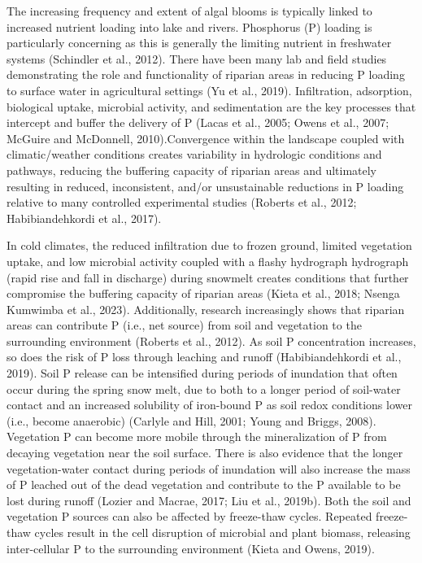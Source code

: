 \documentclass[
]{agujournal2019}
\begin{document}
The increasing frequency and extent of algal blooms is typically linked
to increased nutrient loading into lake and rivers. Phosphorus (P)
loading is particularly concerning as this is generally the limiting
nutrient in freshwater systems (Schindler et al., 2012). There have been
many lab and field studies demonstrating the role and functionality of
riparian areas in reducing P loading to surface water in agricultural
settings (Yu et al., 2019). Infiltration, adsorption, biological uptake,
microbial activity, and sedimentation are the key processes that
intercept and buffer the delivery of P (Lacas et al., 2005; Owens et
al., 2007; McGuire and McDonnell, 2010).Convergence within the landscape
coupled with climatic/weather conditions creates variability in
hydrologic conditions and pathways, reducing the buffering capacity of
riparian areas and ultimately resulting in reduced, inconsistent, and/or
unsustainable reductions in P loading relative to many controlled
experimental studies (Roberts et al., 2012; Habibiandehkordi et al.,
2017).

In cold climates, the reduced infiltration due to frozen ground, limited
vegetation uptake, and low microbial activity coupled with a flashy
hydrograph hydrograph (rapid rise and fall in discharge) during snowmelt
creates conditions that further compromise the buffering capacity of
riparian areas (Kieta et al., 2018; Nsenga Kumwimba et al., 2023).
Additionally, research increasingly shows that riparian areas can
contribute P (i.e., net source) from soil and vegetation to the
surrounding environment (Roberts et al., 2012). As soil P concentration
increases, so does the risk of P loss through leaching and runoff
(Habibiandehkordi et al., 2019). Soil P release can be intensified
during periods of inundation that often occur during the spring snow
melt, due to both to a longer period of soil-water contact and an
increased solubility of iron-bound P as soil redox conditions lower
(i.e., become anaerobic) (Carlyle and Hill, 2001; Young and Briggs,
2008). Vegetation P can become more mobile through the mineralization of
P from decaying vegetation near the soil surface. There is also evidence
that the longer vegetation-water contact during periods of inundation
will also increase the mass of P leached out of the dead vegetation and
contribute to the P available to be lost during runoff (Lozier and
Macrae, 2017; Liu et al., 2019b). Both the soil and vegetation P sources
can also be affected by freeze-thaw cycles. Repeated freeze-thaw cycles
result in the cell disruption of microbial and plant biomass, releasing
inter-cellular P to the surrounding environment (Kieta and Owens, 2019).
\end{document}
